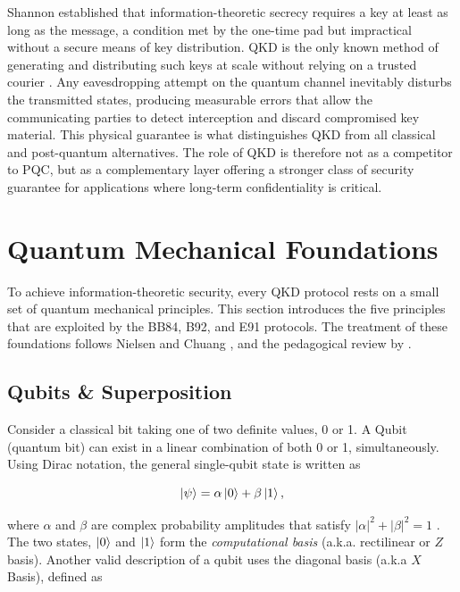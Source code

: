 \documentclass[10pt, a4paper]{report}
\begin{document}
Shannon \cite{Shannon1945} established that information-theoretic secrecy requires a key at least as long as the message, a condition met by the one-time pad but impractical without a secure means of key distribution. QKD is the only known method of generating and distributing such keys at scale without relying on a trusted courier \cite{QKDbible}. Any eavesdropping attempt on the quantum channel inevitably disturbs the transmitted states, producing measurable errors that allow the communicating parties to detect interception and discard compromised key material. This physical guarantee is what distinguishes QKD from all classical and post-quantum alternatives. The role of QKD is therefore not as a competitor to PQC, but as a complementary layer offering a stronger class of security guarantee for applications where long-term confidentiality is critical.

\section{Quantum Mechanical Foundations}

To achieve information-theoretic security, every QKD protocol rests on a small set of quantum mechanical principles. This section introduces the five principles that are exploited by the BB84, B92, and E91 protocols. The treatment of these foundations follows Nielsen and Chuang \cite{QKDbible}, and the pedagogical review by \cite{Scarani2009}. 

\subsection{Qubits \& Superposition}
Consider a classical bit taking one of two definite values, 0 or 1. A Qubit (quantum bit) can exist in a linear combination of both 0 or 1, simultaneously. Using Dirac notation, the general single-qubit state is written as

%
\begin{equation}
\label{eq:qubit}
\ket{\psi} = \alpha\ket{0} + \beta\ket{1},
\end{equation}
%

where $\alpha$ and $\beta$ are complex probability amplitudes that satisfy $|\alpha|^{2}+|\beta|^{2}=1$ \cite{QKDbible}. The two states, $\ket{0}$ and $\ket{1}$ form the \textit{computational basis} (a.k.a. rectilinear or $Z$ basis). Another valid description of a qubit uses the diagonal basis (a.k.a $X$ Basis), defined as
\end{document}
